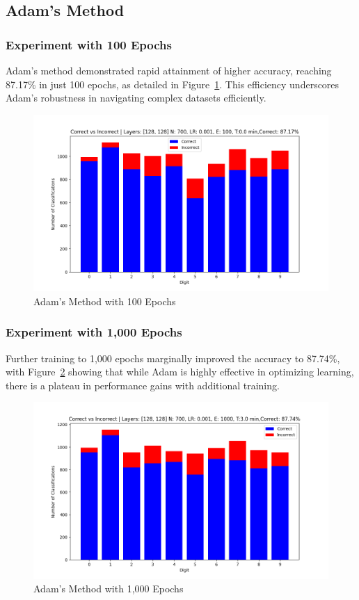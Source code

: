 \documentclass{article}
\begin{document}
\subsection{Adam's Method}

\subsubsection{Experiment with 100 Epochs}
Adam's method demonstrated rapid attainment of higher accuracy, reaching 87.17\% in just 100 epochs, as detailed in Figure~\ref{fig:Adam_100ep}. This efficiency underscores Adam's robustness in navigating complex datasets efficiently.

\begin{figure}[h!]
    \centering
    \includegraphics[scale=0.5]{../figs/Adam_100ep.png}
    \caption{Adam's Method with 100 Epochs}
    \label{fig:Adam_100ep}
\end{figure}

\subsubsection{Experiment with 1,000 Epochs}
Further training to 1,000 epochs marginally improved the accuracy to 87.74\%, with Figure~\ref{fig:Adam_1000ep} showing that while Adam is highly effective in optimizing learning, there is a plateau in performance gains with additional training.

\begin{figure}[h!]
    \centering
    \includegraphics[scale=0.5]{../figs/Adam_1000ep.png}
    \caption{Adam's Method with 1,000 Epochs}
    \label{fig:Adam_1000ep}
\end{figure}
\end{document}
